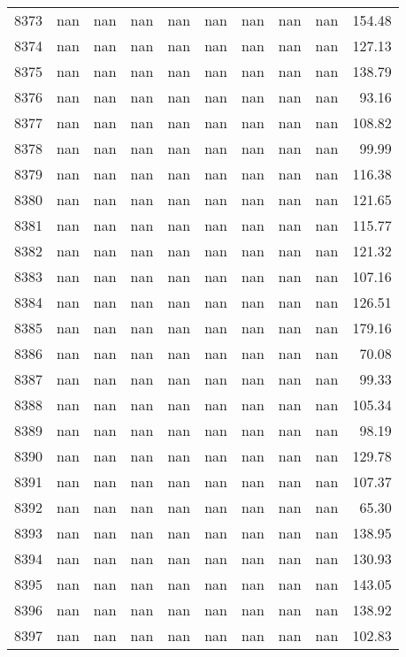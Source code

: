 \begin{tabular}{lrrrrrrrrr}
8373 & nan & nan & nan & nan & nan & nan & nan & nan & 154.48 \\
8374 & nan & nan & nan & nan & nan & nan & nan & nan & 127.13 \\
8375 & nan & nan & nan & nan & nan & nan & nan & nan & 138.79 \\
8376 & nan & nan & nan & nan & nan & nan & nan & nan & 93.16 \\
8377 & nan & nan & nan & nan & nan & nan & nan & nan & 108.82 \\
8378 & nan & nan & nan & nan & nan & nan & nan & nan & 99.99 \\
8379 & nan & nan & nan & nan & nan & nan & nan & nan & 116.38 \\
8380 & nan & nan & nan & nan & nan & nan & nan & nan & 121.65 \\
8381 & nan & nan & nan & nan & nan & nan & nan & nan & 115.77 \\
8382 & nan & nan & nan & nan & nan & nan & nan & nan & 121.32 \\
8383 & nan & nan & nan & nan & nan & nan & nan & nan & 107.16 \\
8384 & nan & nan & nan & nan & nan & nan & nan & nan & 126.51 \\
8385 & nan & nan & nan & nan & nan & nan & nan & nan & 179.16 \\
8386 & nan & nan & nan & nan & nan & nan & nan & nan & 70.08 \\
8387 & nan & nan & nan & nan & nan & nan & nan & nan & 99.33 \\
8388 & nan & nan & nan & nan & nan & nan & nan & nan & 105.34 \\
8389 & nan & nan & nan & nan & nan & nan & nan & nan & 98.19 \\
8390 & nan & nan & nan & nan & nan & nan & nan & nan & 129.78 \\
8391 & nan & nan & nan & nan & nan & nan & nan & nan & 107.37 \\
8392 & nan & nan & nan & nan & nan & nan & nan & nan & 65.30 \\
8393 & nan & nan & nan & nan & nan & nan & nan & nan & 138.95 \\
8394 & nan & nan & nan & nan & nan & nan & nan & nan & 130.93 \\
8395 & nan & nan & nan & nan & nan & nan & nan & nan & 143.05 \\
8396 & nan & nan & nan & nan & nan & nan & nan & nan & 138.92 \\
8397 & nan & nan & nan & nan & nan & nan & nan & nan & 102.83 \\

\end{tabular}
